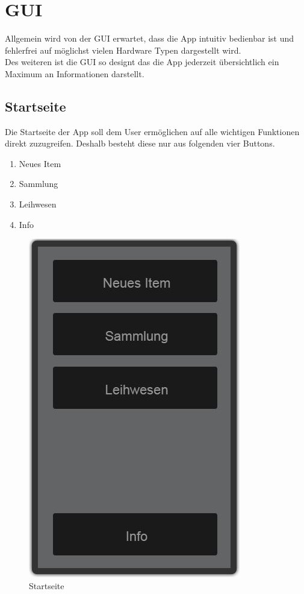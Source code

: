 \section{GUI}

Allgemein wird von der GUI erwartet, dass die App intuitiv bedienbar ist und fehlerfrei auf möglichst vielen Hardware Typen dargestellt wird. \\

Des weiteren ist die GUI so designt das die App jederzeit übersichtlich ein Maximum an Informationen darstellt.

\subsection{Startseite}

Die Startseite der App soll dem User ermöglichen auf alle wichtigen Funktionen direkt zuzugreifen. Deshalb besteht diese nur aus folgenden vier Buttons.

\begin{enumerate}
	\item Neues Item
	\item Sammlung
	\item Leihwesen
	\item Info
\end{enumerate}

\begin{figure}[htbp]
	\centering
	\includegraphics[scale=0.5]{pic/GUI/Main}
	\caption{Startseite}
\end{figure}